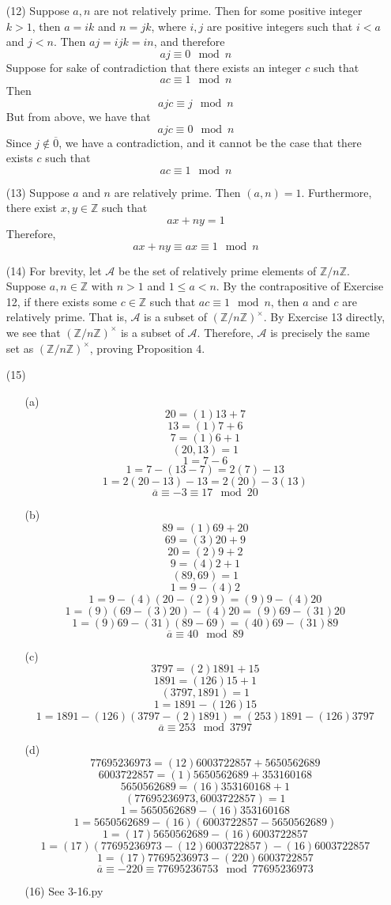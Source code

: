\documentclass[12pt]{article}
\begin{document}
\begin{itemize}
\item[(12)] Suppose $a, n$ are not relatively prime. Then for some positive integer $k > 1$, then $a = ik$ and $n = jk$, where $i, j$ are positive integers such that $i < a$ and $j < n$. Then $aj = ijk = in$, and therefore
$$aj \equiv 0 \mod n$$
Suppose for sake of contradiction that there exists an integer $c$ such that 
$$ac \equiv 1 \mod n$$
Then 
$$ajc \equiv j \mod n$$
But from above, we have that 
$$ajc \equiv 0 \mod n$$
Since $j \not \in \overline{0}$, we have a contradiction, and it cannot be the case that there exists $c$ such that
$$ac \equiv 1 \mod n$$
\item[(13)] Suppose $a$ and $n$ are relatively prime. Then $(a, n) = 1$. Furthermore, there exist $x, y \in \mathbb{Z}$ such that
$$ax + ny = 1$$
Therefore,
$$ax + ny \equiv ax \equiv 1 \mod n$$
\item[(14)] For brevity, let $\mathcal{A}$ be the set of relatively prime elements of $\mathbb{Z}/n\mathbb{Z}$. Suppose $a, n \in \mathbb{Z}$ with $n > 1$ and $1 \leq a < n$. By the contrapositive of Exercise 12, if there exists some $c \in \mathbb{Z}$ such that $ac \equiv 1 \mod n$, then $a$ and $c$ are relatively prime. That is, $\mathcal{A}$ is a subset of $(\mathbb{Z}/n\mathbb{Z})^\times$. By Exercise 13 directly, we see that $(\mathbb{Z}/n\mathbb{Z})^\times$ is a subset of $\mathcal{A}$. Therefore, $\mathcal{A}$ is precisely the same set as $(\mathbb{Z}/n\mathbb{Z})^\times$, proving Proposition 4.
\item[(15)]
\begin{itemize}
\item[(a)]
$$20 = (1)13 + 7$$
$$13 = (1)7 + 6$$
$$7 = (1)6 + 1$$
$$(20, 13) = 1$$
$$1 = 7 - 6$$
$$1 = 7 - (13 - 7) = 2(7) - 13$$
$$1 = 2(20 - 13) - 13 = 2(20) - 3(13)$$
$$\overline{a} \equiv -3 \equiv 17 \mod 20$$
\item[(b)]
$$89 = (1)69 + 20$$
$$69 = (3)20 + 9$$
$$20 = (2)9 + 2$$
$$9 = (4)2 + 1$$
$$(89, 69) = 1$$
$$1 = 9 - (4)2$$
$$1 = 9 - (4)(20 - (2)9) = (9)9 - (4)20$$
$$1 = (9)(69 - (3)20) - (4)20 = (9)69 - (31)20$$
$$1 = (9)69 - (31)(89 - 69) = (40)69 - (31)89$$
$$\overline{a} \equiv 40 \mod 89$$
\item[(c)]
$$3797 = (2)1891 + 15$$
$$1891 = (126)15 + 1$$
$$(3797, 1891) = 1$$
$$1 = 1891 - (126)15$$
$$1 = 1891 - (126)(3797 - (2)1891) = (253)1891 - (126)3797$$
$$\overline{a} \equiv 253 \mod 3797$$
\item[(d)]
$$77695236973 = (12)6003722857 + 5650562689$$
$$6003722857 = (1)5650562689 + 353160168$$
$$5650562689 = (16)353160168 + 1$$
$$(77695236973, 6003722857) = 1$$
$$1 = 5650562689 - (16)353160168$$
$$1 = 5650562689 - (16)(6003722857 - 5650562689)$$
$$1 = (17)5650562689 - (16)6003722857$$
$$1 = (17)(77695236973 - (12)6003722857) - (16)6003722857$$
$$1 = (17)77695236973 - (220)6003722857$$
$$\overline{a} \equiv -220 \equiv 77695236753 \mod 77695236973$$
\item[(16)] See 3-16.py
\end{itemize}
\end{itemize}
\end{document}
